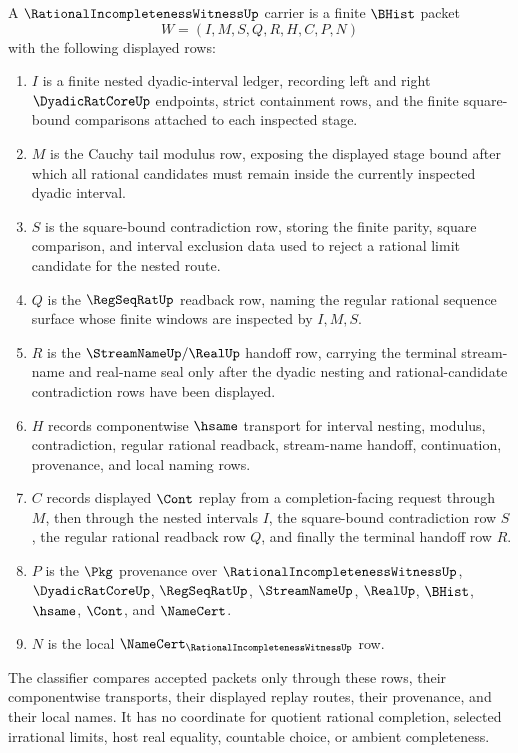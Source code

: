 \begin{definition}
\label{def:rational-incompleteness-witness-carrier}
A $\RationalIncompletenessWitnessUp$ carrier is a finite $\BHist$ packet
$$
W=(I,M,S,Q,R,H,C,P,N)
$$
with the following displayed rows:
\begin{enumerate}
\item $I$ is a finite nested dyadic-interval ledger, recording left and right $\DyadicRatCoreUp$ endpoints, strict containment rows, and the finite square-bound comparisons attached to each inspected stage.
\item $M$ is the Cauchy tail modulus row, exposing the displayed stage bound after which all rational candidates must remain inside the currently inspected dyadic interval.
\item $S$ is the square-bound contradiction row, storing the finite parity, square comparison, and interval exclusion data used to reject a rational limit candidate for the nested route.
\item $Q$ is the $\RegSeqRatUp$ readback row, naming the regular rational sequence surface whose finite windows are inspected by $I,M,S$.
\item $R$ is the $\StreamNameUp/\RealUp$ handoff row, carrying the terminal stream-name and real-name seal only after the dyadic nesting and rational-candidate contradiction rows have been displayed.
\item $H$ records componentwise $\hsame$ transport for interval nesting, modulus, contradiction, regular rational readback, stream-name handoff, continuation, provenance, and local naming rows.
\item $C$ records displayed $\Cont$ replay from a completion-facing request through $M$, then through the nested intervals $I$, the square-bound contradiction row $S$, the regular rational readback row $Q$, and finally the terminal handoff row $R$.
\item $P$ is the $\Pkg$ provenance over $\RationalIncompletenessWitnessUp$, $\DyadicRatCoreUp$, $\RegSeqRatUp$, $\StreamNameUp$, $\RealUp$, $\BHist$, $\hsame$, $\Cont$, and $\NameCert$.
\item $N$ is the local $\NameCert_{\RationalIncompletenessWitnessUp}$ row.
\end{enumerate}
The classifier compares accepted packets only through these rows, their componentwise transports, their displayed replay routes, their provenance, and their local names. It has no coordinate for quotient rational completion, selected irrational limits, host real equality, countable choice, or ambient completeness.
\end{definition}

